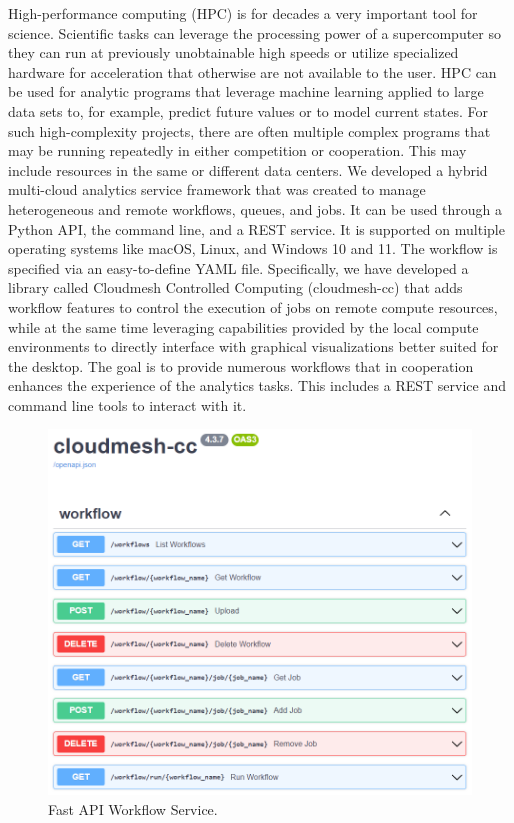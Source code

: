 High-performance computing (HPC) is for decades a very important tool for science. Scientific tasks can leverage the processing power of a supercomputer so they can run at previously unobtainable high speeds or utilize specialized hardware for acceleration that otherwise are not available to the user. HPC can be used for analytic programs that leverage machine learning applied to large data sets to, for example, predict future values or to model current states. For such high-complexity projects, 
there are often multiple complex programs that may be running repeatedly in either competition or cooperation. This may include resources in the same or different data centers. We developed 
a hybrid multi-cloud analytics service framework that was created to manage heterogeneous and remote workflows, queues, and jobs. It can be used through a Python API, the command line, and a REST service. It is supported on multiple operating systems like macOS, Linux, and Windows 10 and 11. 
The workflow is specified via an easy-to-define YAML file.
Specifically, we have developed a library called Cloudmesh Controlled Computing (cloudmesh-cc) that adds workflow features to control the execution of jobs on remote compute resources, while at the same time leveraging capabilities provided by the local compute environments to directly interface with graphical visualizations better suited for the desktop. The goal is to provide numerous workflows that in cooperation enhances the experience of the analytics tasks. This includes a REST service and command line tools to interact with it.


\begin{figure}[htb]
\centering\includegraphics[width=0.7\columnwidth]{images/fastapi-service.png}
\caption{Fast API Workflow Service.}
\label{fig:fastapi-cc-arch}
\end{figure}

